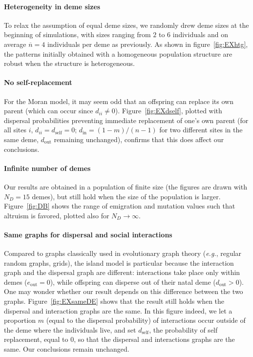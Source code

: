 \documentclass[11pt, letterpaper]{article}
\newcommand{\eg}{\textit{e.g.}}
\newcommand{\self}{\textrm{self}}
\newcommand{\inn}{\textrm{in}}
\newcommand{\out}{\textrm{out}}
\newcommand{\eout}{e_{\out}}
\newcommand{\din}{d_{\inn}}
\newcommand{\dself}{d_{\self}}
\newcommand{\dout}{d_{\out}}
\newcommand{\ndemes}{N_D}
\begin{document}
\paragraph{Heterogeneity in deme sizes}To relax the assumption of equal deme sizes, we randomly drew deme sizes at the beginning of simulations, with sizes ranging from $2$ to $6$ individuals and on average $\overline{n} = 4$ individuals per deme as previously. As shown in figure~\ref{fig:EXhtg}, the patterns initially obtained with a homogeneous population structure are robust when the structure is heterogeneous. 
 
\paragraph{No self-replacement}For the Moran model, it may seem odd that an offspring can replace its own parent (which can occur since $d_{ii} \neq 0$). Figure~\ref{fig:EXdself}, plotted with dispersal probabilities preventing immediate replacement of one's own parent (for all sites $i$, $d_{ii}=\dself=0$; $\din = (1-m)/(n-1)$ for two different sites in the same deme, $\dout$ remaining unchanged), confirms that this does affect our conclusions. 

\paragraph{Infinite number of demes}Our results are obtained in a population of finite size (the figures are drawn with $\ndemes =15$ demes), but still hold when the size of the population is larger. Figure~\ref{fig:DB} shows the range of emigration and mutation values such that altruism is favored, plotted also for $\ndemes\to \infty$.

\paragraph{Same graphs for dispersal and social interactions} Compared to graphs classically used in evolutionary graph theory (\eg, regular random graphs, grids), the island model is particular because the interaction graph and the dispersal graph are different: interactions take place only within demes ($\eout = 0$), while offspring can disperse out of their natal deme ($\dout >0$). One may wonder whether our result depends on this difference between the two graphs. Figure~\ref{fig:EXsameDE} shows that the result still holds when the dispersal and interaction graphs are the same. In this figure indeed, we let a proportion $m$ (equal to the dispersal probability) of interactions occur outside of the deme where the individuals live, and set $\dself$, the probability of self replacement, equal to $0$, so that the dispersal and interactions graphs are the same. Our conclusions remain unchanged.
\end{document}
